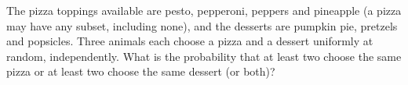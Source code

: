 The pizza toppings available are pesto, pepperoni, peppers and pineapple (a pizza may have any subset, including none), and the desserts are pumpkin pie, pretzels and popsicles. Three animals each choose a pizza and a dessert uniformly at random, independently. What is the probability that at least two choose the same pizza or at least two choose the same dessert (or both)?
